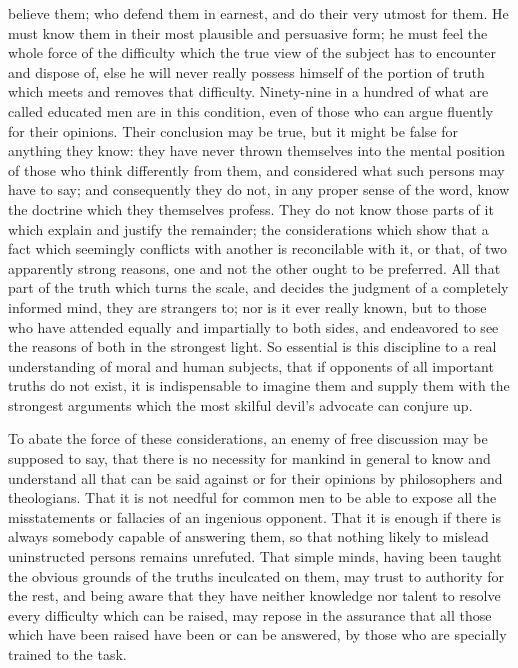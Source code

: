 \documentclass[12pt]{report}
\begin{document}
believe them; who defend them in earnest, and do their very utmost for them. He must know them in their most plausible and persuasive form; he must feel the whole force of the difficulty which the true view of the subject has to encounter and dispose of, else he will never really possess himself of the portion of truth which meets and removes that difficulty. Ninety-nine in a hundred of what are called educated men are in this condition, even of those who can argue fluently for their opinions. Their conclusion may be true, but it might be false for anything they know: they have never thrown themselves into the mental position of those who think differently from them, and considered what such persons may have to say; and consequently they do not, in any proper sense of the word, know the doctrine which they themselves profess. They do not know those parts of it which explain and justify the remainder; the considerations which show that a fact which seemingly conflicts with another is reconcilable with it, or that, of two apparently strong reasons, one and not the other ought to be preferred. All that part of the truth which turns the scale, and decides the judgment of a completely informed mind, they are strangers to; nor is it ever really known, but to those who have attended equally and impartially to both sides, and endeavored to see the reasons of both in the strongest light. So essential is this discipline to a real understanding of moral and human subjects, that if opponents of all important truths do not exist, it is indispensable to imagine them and supply them with the strongest arguments which the most skilful devil's advocate can conjure up.

To abate the force of these considerations, an enemy of free discussion may be supposed to say, that there is no necessity for mankind in general to know and understand all that can be said against or for their opinions by philosophers and theologians. That it is not needful for common men to be able to expose all the misstatements or fallacies of an ingenious opponent. That it is enough if there is always somebody capable of answering them, so that nothing likely to mislead uninstructed persons remains unrefuted. That simple minds, having been taught the obvious grounds of the truths inculcated on them, may trust to authority for the rest, and being aware that they have neither knowledge nor talent to resolve every difficulty which can be raised, may repose in the assurance that all those which have been raised have been or can be answered, by those who are specially trained to the task.
\end{document}
